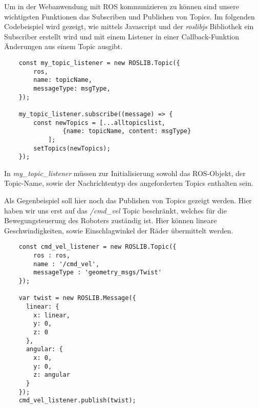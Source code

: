 \begin{flushleft}

\label{webroscomm_code}Um in der Webanwendung mit ROS kommunizieren zu können sind unsere wichtigsten Funktionen das Subscriben und Publishen von Topics. Im folgenden Codebeispiel wird gezeigt, wie mittels Javascript und der \textit{roslibjs} Bibliothek ein Subscriber erstellt wird und mit einem Listener in einer Callback-Funktion Änderungen aus einem Topic ausgibt.

\begin{lstlisting}
    const my_topic_listener = new ROSLIB.Topic({
        ros,
        name: topicName,
        messageType: msgType,
    });

    my_topic_listener.subscribe((message) => {
        const newTopics = [...alltopicslist, 
                {name: topicName, content: msgType}
            ];
        setTopics(newTopics);
    });
\end{lstlisting}

In \textit{my\_topic\_listener} müssen zur Initialisierung sowohl das ROS-Objekt, der Topic-Name, sowie der Nachrichtentyp des angeforderten Topics enthalten sein.

Als Gegenbeispiel soll hier noch das Publishen von Topics gezeigt werden. Hier haben wir uns erst auf das \textit{/cmd\_vel} Topic beschränkt, welches für die Bewegungsteuerung des Roboters zuständig ist. Hier können lineare Geschwindigkeiten, sowie Einschlagwinkel der Räder übermittelt werden.

\begin{lstlisting}
    const cmd_vel_listener = new ROSLIB.Topic({
        ros : ros,
        name : '/cmd_vel',
        messageType : 'geometry_msgs/Twist'
    });

    var twist = new ROSLIB.Message({
      linear: {
        x: linear,
        y: 0,
        z: 0
      },
      angular: {
        x: 0,
        y: 0,
        z: angular
      }
    });
    cmd_vel_listener.publish(twist);
\end{lstlisting}

\end{flushleft}